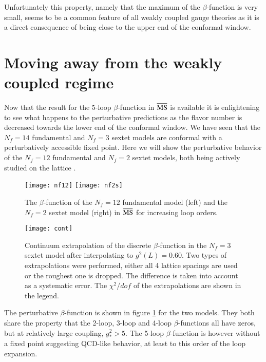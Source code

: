 \documentclass[epj]{webofc}
\def\msbar{\overline{\rm MS\kern-0.5pt}\kern0.5pt}
\begin{document}
Unfortunately this
property, namely that the maximum of the $\beta$-function is very small, 
seems to be a common feature of all weakly coupled gauge theories as it is a direct consequence of being close
to the upper end of the conformal window.


\section{Moving away from the weakly coupled regime}
\label{5loop}

Now that the result for the 5-loop $\beta$-function in $\msbar$ is available \cite{Baikov:2016tgj, Herzog:2017ohr}
it is enlightening to see what happens to
the perturbative predictions as the flavor number is decreased towards the lower end of the conformal window. We have
seen that the $N_f = 14$ fundamental and $N_f = 3$ sextet models are conformal with a perturbatively accessible fixed
point. Here we will show the perturbative behavior of the $N_f = 12$ fundamental and $N_f = 2$ sextet models, both being
actively studied on the lattice \cite{Hansen:2017ejh,Hansen:2016sxp,Drach:2015sua, Fodor:2016pls, Fodor:2016wal,
Fodor:2015zna, Cheng:2014jba, Hasenfratz:2016dou, Hasenfratz:2017mdh, Fodor:2016zil, Fodor:2017gtj}.

\begin{figure}
\centering
\texttt{[image: nf12]}  \texttt{[image: nf2s]}
\caption{The $\beta$-function of the $N_f = 12$ fundamental model (left) and the $N_f = 2$ sextet model (right) 
in $\msbar$ for increasing loop orders.}
\label{nf12nf2s}
\end{figure}


\begin{figure}
\centering
\texttt{[image: cont]}
\caption{Continuum extrapolation of the discrete $\beta$-function in the $N_f = 3$ sextet model after interpolating to
$g^2(L) = 0.60$. Two types of extrapolations were performed, either all 4 lattice spacings are used or the roughest one
is dropped. The difference is taken into account as a systematic error. 
The $\chi^2/dof$ of the extrapolations are shown in the legend.}
\label{cont}
\end{figure}

The perturbative $\beta$-function is shown in figure \ref{nf12nf2s} for the two models. They both share the
property that the 2-loop, 3-loop and 4-loop $\beta$-functions all have zeros, but at relatively large coupling, $g_*^2 >
5$. The 5-loop $\beta$-function is however without a fixed point suggesting QCD-like behavior, at least to this order of
the loop expansion. 
\end{document}
